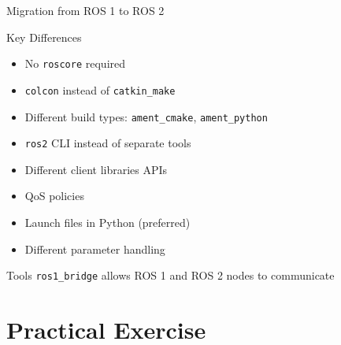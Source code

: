 \begin{frame}{Migration from ROS 1 to ROS 2}
    \begin{block}{Key Differences}
        \begin{itemize}
            \item No \texttt{roscore} required
            \item \texttt{colcon} instead of \texttt{catkin\_make}
            \item Different build types: \texttt{ament\_cmake}, \texttt{ament\_python}
            \item \texttt{ros2} CLI instead of separate tools
            \item Different client libraries APIs
            \item QoS policies
            \item Launch files in Python (preferred)
            \item Different parameter handling
        \end{itemize}
    \end{block}

    \begin{alertblock}{Tools}
        \texttt{ros1\_bridge} allows ROS 1 and ROS 2 nodes to communicate
    \end{alertblock}
\end{frame}

\section{Practical Exercise}

